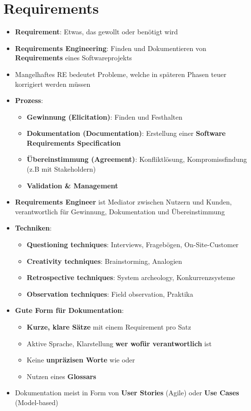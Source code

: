 \section{Requirements}
\label{rq:sec:requirements}

\begin{itemize}
	\item \textbf{Requirement}: Etwas, das gewollt oder benötigt wird
	\item \textbf{Requirements Engineering}: Finden und Dokumentieren von \textbf{Requirements} eines Softwareprojekts
	\item Mangelhaftes RE bedeutet Probleme, welche in späteren Phasen teuer korrigiert werden müssen
	\item \textbf{Prozess}:
	\begin{itemize}
		\item \textbf{Gewinnung (Elicitation)}: Finden und Festhalten
		\item \textbf{Dokumentation (Documentation)}: Erstellung einer \textbf{Software Requirements Specification}
		\item \textbf{Übereinstimmung (Agreement)}: Konfliktlösung, Kompromissfindung (z.B mit Stakeholdern)
		\item \textbf{Validation \& Management}
	\end{itemize}
	\item \textbf{Requirements Engineer} ist Mediator zwischen Nutzern und Kunden, verantwortlich für Gewinnung, Dokumentation und Übereinstimmung
	\item \textbf{Techniken}:
	\begin{itemize}
		\item \textbf{Questioning techniques}: Interviews, Fragebögen, On-Site-Customer
		\item \textbf{Creativity techniques}: Brainstorming, Analogien
		\item \textbf{Retrospective techniques}: System archeology, Konkurrenzsysteme
		\item \textbf{Observation techniques}: Field observation, Praktika
	\end{itemize}
	\item \textbf{Gute Form für Dokumentation}:
	\begin{itemize}
		\item \textbf{Kurze, klare Sätze} mit einem Requirement pro Satz
		\item Aktive Sprache, Klarstellung \textbf{wer wofür verantwortlich} ist
		\item Keine \textbf{unpräzisen Worte} wie  oder 
		\item Nutzen eines \textbf{Glossars}
	\end{itemize}
	\item Dokumentation meist in Form von \textbf{User Stories} (Agile) oder \textbf{Use Cases} (Model-based)
\end{itemize}

